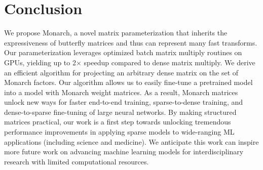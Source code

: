 \section{Conclusion}
\label{sec:conclusion}
We propose Monarch, a novel matrix parameterization that inherits the expressiveness of butterfly matrices and thus can represent many fast transforms. Our parameterization leverages optimized batch matrix multiply routines on GPUs, yielding up to 2$\times$ speedup compared to dense matrix multiply. We derive an efficient algorithm for projecting an arbitrary dense matrix on the set of Monarch factors. Our algorithm allows us to easily fine-tune a pretrained model into a model with Monarch weight matrices. As a result, Monarch matrices unlock new ways for faster end-to-end training, sparse-to-dense training, and dense-to-sparse fine-tuning of large neural networks. By making structured matrices practical, our work is a first step towards unlocking tremendous performance improvements in applying sparse models to wide-ranging ML applications (including science and medicine). We anticipate this work can inspire more future work on advancing machine learning models for interdisciplinary research with limited computational resources.


